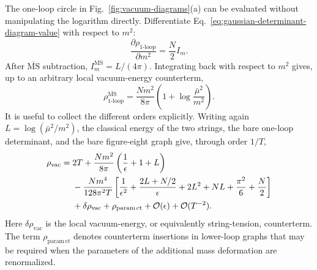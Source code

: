 The one-loop circle in Fig.~\ref{fig:vacuum-diagrams}(a) can be evaluated
without manipulating the logarithm directly.  Differentiate
Eq.~\eqref{eq:gaussian-determinant-diagram-value} with respect to $m^2$:
\begin{equation}
  \frac{\partial\rho_{1\text{-loop}}}{\partial m^2}
  =\frac{N}{2}I_m.
  \label{eq:gaussian-one-loop-tadpole-derivative}
\end{equation}
After $\overline{\mathrm{MS}}$ subtraction,
$I_m^{\overline{\mathrm{MS}}}=L/(4\pi)$.  Integrating back with respect to
$m^2$ gives, up to an arbitrary local vacuum-energy counterterm,
\begin{equation}
  \rho_{1\text{-loop}}^{\overline{\mathrm{MS}}}
  = \frac{Nm^2}{8\pi}
    \left(1+\log\frac{\bar\mu^2}{m^2}\right).
  \label{eq:gaussian-one-loop-vacuum-msbar}
\end{equation}
It is useful to collect the different orders explicitly.  Writing again
$L=\log(\bar\mu^2/m^2)$, the classical energy of the two strings, the bare
one-loop determinant, and the bare figure-eight graph give, through order
$1/T$,
\begin{align}
  \rho_{\mathrm{vac}}
  ={}& 2T
  +\frac{Nm^2}{8\pi}
   \left(\frac{1}{\epsilon}+1+L\right)
  \notag\\
  &-\frac{Nm^4}{128\pi^2T}
  \left[
    \frac{1}{\epsilon^2}
    +\frac{2L+N/2}{\epsilon}
    +2L^2+NL+\frac{\pi^2}{6}+\frac{N}{2}
  \right]
  \notag\\
  &+\delta\rho_{\mathrm{vac}}
   +\rho_{\mathrm{param\,ct}}
   +\mathcal O(\epsilon)+\mathcal O(T^{-2}).
  \label{eq:total-vacuum-energy-bare-through-fig8}
\end{align}
Here $\delta\rho_{\mathrm{vac}}$ is the local vacuum-energy, or equivalently
string-tension, counterterm.  The term $\rho_{\mathrm{param\,ct}}$ denotes
counterterm insertions in lower-loop graphs that may be required when the
parameters of the additional mass deformation are renormalized.

